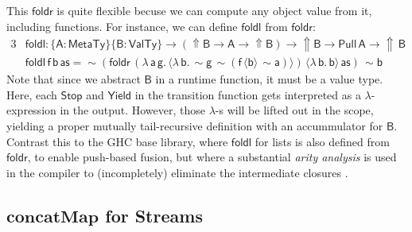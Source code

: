 \documentclass[acmsmall,screen,review,anonymous]{acmart}
\newcommand{\msf}[1]{{\mathsf{#1}}}
\newcommand{\mbf}[1]{{\mathbf{#1}}}
\newcommand{\bs}[1]{\boldsymbol{#1}}
\newcommand{\lam}{\lambda\,}
\newcommand{\vas}{\mathsf{as}}
\newcommand{\vA}{\mathsf{A}}
\newcommand{\vB}{\mathsf{B}}
\newcommand{\va}{\mathsf{a}}
\newcommand{\vb}{\mathsf{b}}
\newcommand{\vf}{\mathsf{f}}
\newcommand{\vg}{\mathsf{g}}
\newcommand{\foldr}{\msf{foldr}}
\newcommand{\foldl}{\msf{foldl}}
\newcommand{\Lift}{{\Uparrow}}
\newcommand{\spl}{{\bs{\sim}}}
\newcommand{\ql}{{\bs{\langle}}}
\newcommand{\qr}{{\bs{\rangle}}}
\newcommand{\MTy}{\msf{MetaTy}}
\newcommand{\VTy}{\msf{ValTy}}
\theoremstyle{remark}
\newcommand{\qt}[1]{\ql#1\qr}
\newcommand{\Stop}{\msf{Stop}}
\newcommand{\Yield}{\msf{Yield}}
\newcommand{\Pull}{\msf{Pull}}
\begin{document}
This $\foldr$ is quite flexible becuse we can compute any object value from it,
including functions. For instance, we can define $\foldl$ from $\foldr$:
\begin{alignat*}{3}
  &\foldl : \{\vA : \MTy\}\{\vB : \VTy\} \to (\Lift \vB \to \vA \to \Lift \vB) \to \Lift \vB \to \Pull\,\vA \to \Lift\,\vB\\
  &\foldl\,\vf\,\vb\,\vas = \spl(\foldr\,(\lam \va\,\vg.\,\qt{\lam \vb.\,\spl \vg\,\spl(\vf\,\qt{\vb}\,\spl \va)})\,\qt{\lam \vb.\,\vb}\,\vas)\,\spl \vb
\end{alignat*}
Note that since we abstract $\vB$ in a runtime function, it must be a value
type. Here, each $\Stop$ and $\Yield$ in the transition function gets
interpreted as a $\lambda$-expression in the output. However, those $\lambda$-s
will be lifted out in the scope, yielding a proper mutually tail-recursive
definition with an accummulator for $\vB$. Contrast this to the GHC base
library, where $\foldl$ for lists is also defined from $\foldr$, to enable
push-based fusion, but where a substantial \emph{arity analysis} is used in
the compiler to (incompletely) eliminate the intermediate closures
\cite{DBLP:conf/sfp/Breitner14}.

\subsection{$\mbf{concatMap}$ for Streams}\label{sec:concatmap-for-streams}
\end{document}
